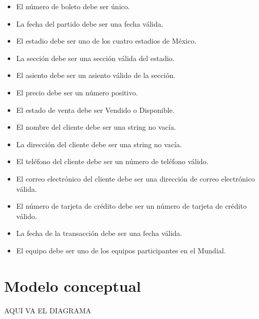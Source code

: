 \begin{itemize}
    \item El número de boleto debe ser único.
    \item La fecha del partido debe ser una fecha válida.
    \item El estadio debe ser uno de los cuatro estadios de México.
    \item La sección debe ser una sección válida del estadio.
    \item El asiento debe ser un asiento válido de la sección.
    \item El precio debe ser un número positivo.
    \item El estado de venta debe ser Vendido o Disponible.
    \item El nombre del cliente debe ser una string no vacía.
    \item La dirección del cliente debe ser una string no vacía.
    \item El teléfono del cliente debe ser un número de teléfono válido.
    \item El correo electrónico del cliente debe ser una dirección de correo electrónico válida.
    \item El número de tarjeta de crédito debe ser un número de tarjeta de crédito válido.
    \item La fecha de la transacción debe ser una fecha válida.
    \item El equipo debe ser uno de los equipos participantes en el Mundial.
\end{itemize}


\section{Modelo conceptual}

\begin{center}
    AQUI VA EL DIAGRAMA 
\end{center}


